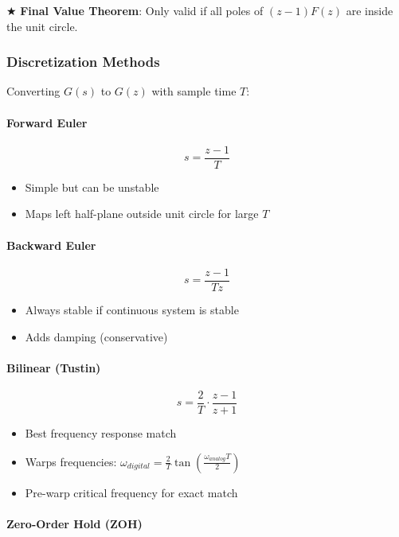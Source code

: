 \documentclass[11pt,a4paper]{book}
\begin{document}
★ \textbf{Final Value Theorem}: Only valid if all poles of $(z-1)F(z)$ are inside the unit circle.

\medskip\noindent\hrulefill\medskip

\subsubsection{Discretization Methods}

Converting $G(s)$ to $G(z)$ with sample time $T$:

\paragraph{Forward Euler}

\[s = \frac{z - 1}{T}\]

\begin{itemize}
\item Simple but can be unstable
\item Maps left half-plane outside unit circle for large $T$
\end{itemize}

\paragraph{Backward Euler}

\[s = \frac{z - 1}{Tz}\]

\begin{itemize}
\item Always stable if continuous system is stable
\item Adds damping (conservative)
\end{itemize}

\paragraph{Bilinear (Tustin)}

\[s = \frac{2}{T} \cdot \frac{z - 1}{z + 1}\]

\begin{itemize}
\item Best frequency response match
\item Warps frequencies: $\omega_{digital} = \frac{2}{T}\tan\left(\frac{\omega_{analog} T}{2}\right)$
\item Pre-warp critical frequency for exact match
\end{itemize}

\paragraph{Zero-Order Hold (ZOH)}
\end{document}
